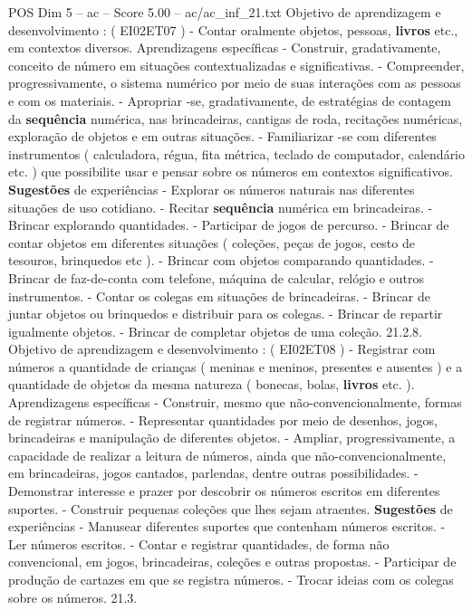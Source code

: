 \begin{textsample}{POS Dim 5 – ac – Score 5.00 – ac/ac\_inf\_21.txt}
Objetivo de aprendizagem e desenvolvimento : ( EI02ET07 ) - Contar oralmente objetos, pessoas, \textbf{livros} etc., em contextos diversos.
Aprendizagens específicas - Construir, gradativamente, conceito de número em situações contextualizadas e significativas. - Compreender, progressivamente, o sistema numérico por meio de suas interações com as pessoas e com os materiais. - Apropriar -se, gradativamente, de estratégias de contagem da \textbf{sequência} numérica, nas brincadeiras, cantigas de roda, recitações numéricas, exploração de objetos e em outras situações. - Familiarizar -se com diferentes instrumentos ( calculadora, régua, fita métrica, teclado de computador, calendário etc. ) que possibilite usar e pensar sobre os números em contextos significativos. \textbf{Sugestões} de experiências - Explorar os números naturais nas diferentes situações de uso cotidiano. - Recitar \textbf{sequência} numérica em brincadeiras. - Brincar explorando quantidades. - Participar de jogos de percurso. - Brincar de contar objetos em diferentes situações ( coleções, peças de jogos, cesto de tesouros, brinquedos etc ). - Brincar com objetos comparando quantidades. - Brincar de faz-de-conta com telefone, máquina de calcular, relógio e outros instrumentos. - Contar os colegas em situações de brincadeiras. - Brincar de juntar objetos ou brinquedos e distribuir para os colegas. - Brincar de repartir igualmente objetos. - Brincar de completar objetos de uma coleção. 21.2.8.
Objetivo de aprendizagem e desenvolvimento : ( EI02ET08 ) - Registrar com números a quantidade de crianças ( meninas e meninos, presentes e ausentes ) e a quantidade de objetos da mesma natureza ( bonecas, bolas, \textbf{livros} etc. ).
Aprendizagens específicas - Construir, mesmo que não-convencionalmente, formas de registrar números. - Representar quantidades por meio de desenhos, jogos, brincadeiras e manipulação de diferentes objetos. - Ampliar, progressivamente, a capacidade de realizar a leitura de números, ainda que não-convencionalmente, em brincadeiras, jogos cantados, parlendas, dentre outras possibilidades. - Demonstrar interesse e prazer por descobrir os números escritos em diferentes suportes. - Construir pequenas coleções que lhes sejam atraentes. \textbf{Sugestões} de experiências - Manusear diferentes suportes que contenham números escritos. - Ler números escritos. - Contar e registrar quantidades, de forma não convencional, em jogos, brincadeiras, coleções e outras propostas. - Participar de produção de cartazes em que se registra números. - Trocar ideias com os colegas sobre os números. 21.3.

\end{textsample}
